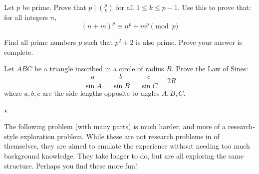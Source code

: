 \begin{problem}
Let $p$ be prime. Prove that $p \mid {\binom{p}{k}}$ for all $1 \leq k \leq p-1$. Use this to prove that: for all integers $n$,
\[
(n+m)^p \equiv n^p+m^p \pmod{p}
\]
\end{problem}

\begin{problem}
Find all prime numbers $p$ such that $p^2 + 2$ is also prime. Prove your answer is complete. 
\end{problem}

\begin{problem}
Let $ABC$ be a triangle inscribed in a circle of radius $R$. Prove the Law of Sines:
\[
\frac{a}{\sin A} = \frac{b}{\sin B} = \frac{c}{\sin C} = 2R
\]
where $a, b, c$ are the side lengths opposite to angles $A, B, C$. 

\hfill $\star$
\end{problem}

The following problem (with many parts) is much harder, and more of a research-style exploration problem. While these are not research problems in of themselves, they are aimed to emulate the experience without needing too much background knowledge. They take longer to do, but are all exploring the same structure. Perhaps you find these more fun!

